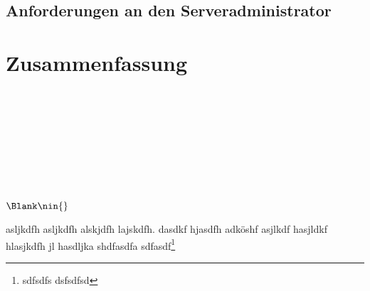 \documentclass[ngerman,pdf]{wkcms}    %
\begin{document}
\subsection{Anforderungen an den Serveradministrator}


\newpage


\section{Zusammenfassung}

\bzgl \bzw \ca \Dh \evtl \etc \ggf \iAllg \oAe \uAe \usf \usw \vgl \zB \\
\cf \cp \ie \eg \etc \wrt \viz \vs \Wlog \\
 \\
  \\
 \\
 \\
  \\
 \\
 $\Blank \nin \{\}$


asljkdfh asljkdfh alskjdfh lajskdfh. dasdkf hjasdfh adköshf asjlkdf
hasjldkf hlasjkdfh jl hasdljka shdfasdfa sdfasdf\footnote{sdfsdfs dsfsdfsd}



\end{document}
